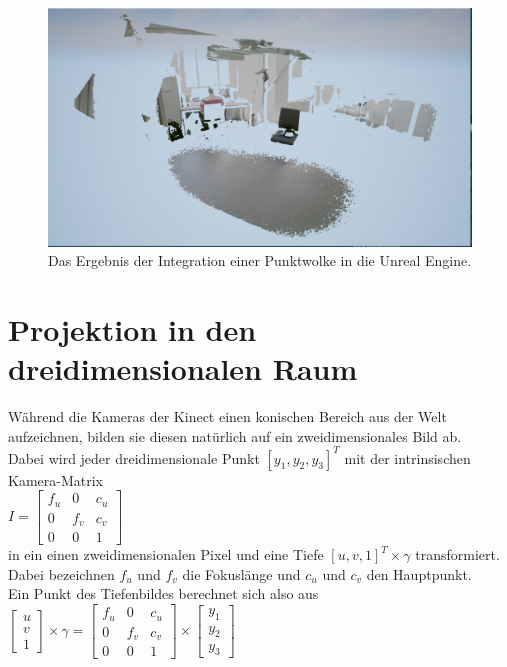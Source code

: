 \documentclass[a4paper]{IEEEtran}
\begin{document}
	\begin{figure}[t]
    	\centering
		\includegraphics[width=\textwidth]{img/Cloud}
	    \caption{Das Ergebnis der Integration einer Punktwolke in die Unreal Engine.}
    	\label{Cloud}
	\end{figure} 
\section{Projektion in den dreidimensionalen Raum}
	Während die Kameras der Kinect einen konischen Bereich aus der Welt aufzeichnen, bilden sie diesen natürlich auf ein zweidimensionales Bild ab. \\
	Dabei wird jeder dreidimensionale Punkt $[y_1,y_2,y_3]^T$ mit der intrinsischen Kamera-Matrix \\ [1cm]

$I = \begin{bmatrix}
f_u & 0 & c_u  \\
0 & f_v & c_v  \\
0 & 0 & 1  
\end{bmatrix}$\\[1cm]

	in ein einen zweidimensionalen Pixel und eine Tiefe $[u,v,1]^T \times \gamma$ transformiert. \\
	Dabei bezeichnen $f_u$ und $f_v$ die Fokuslänge und $c_u$ und $c_v$ den Hauptpunkt. \\
	Ein Punkt des Tiefenbildes berechnet sich also aus \\[1cm]

$\begin{bmatrix}
u \\
v \\
1
\end{bmatrix}
\times
\gamma
= \begin{bmatrix}
f_u & 0 & c_u  \\
0 & f_v & c_v  \\
0 & 0 & 1  
\end{bmatrix}
\times
\begin{bmatrix}
y_1 \\
y_2 \\
y_3
\end{bmatrix}$\\[1cm]
\end{document}

